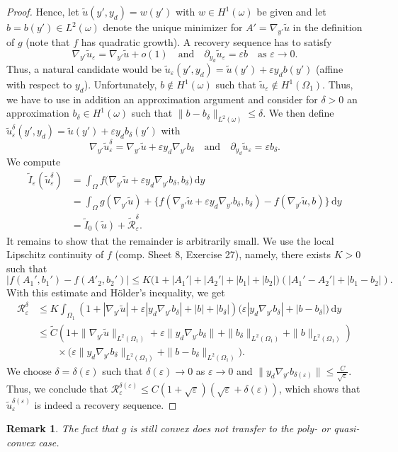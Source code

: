 \documentclass[a4paper,12pt]{article}
\newcommand{\eps}{\varepsilon}
\newcommand{\dd}{\,\mathrm{d}}
\newcommand{\wt}{\widetilde}
\newtheorem{remark}[theorem]{Remark}
\begin{document}
\begin{proof}
Hence, let $\wt u(y',y_d) = w(y')$ with $w\in H^1(\omega)$ be given and let $b=b(y')\in L^2(\omega)$ denote the unique minimizer
for $A' = \nabla_{y'} \wt u$ in the definition of $g$ (note that $f$ has quadratic growth). A recovery sequence has to satisfy
\[
\nabla_{y'} \wt u_\eps = \nabla_{y'}\wt u + o(1)\quad\text{and}
\quad \partial_{y_d}\wt u_\eps = \eps b\quad\text{as }\eps\to 0.
\]
Thus, a natural candidate would be $\wt u_\eps(y',y_d) = 
\wt u(y') + \eps y_d  b(y')$ (affine with respect to $y_d$).
Unfortunately, $b\notin H^1(\omega)$ such that $\wt u_\eps\notin H^1(\Omega_1)$. Thus, we have to use in addition an approximation argument and consider for $\delta>0$ an approximation $b_\delta\in H ^1(\omega)$ such that $\|b-b_
\delta\|_{L^2(\omega)} \leq \delta$. We then define 
$\wt u_\eps^\delta(y',y_d) = 
\wt u(y') + \eps y_d  b_\delta(y')$ with
\[
\nabla_{y'}\wt u_\eps^\delta = 
\nabla_{y'}\wt u + \eps y_d \nabla_{y'} b_\delta\quad\text{and}\quad
\partial_{y_d}\wt u_\eps = \eps b_\delta.
\]
We compute
\begin{align*}
    \wt I_\eps(\wt u_\eps^\delta) &= \int_{\Omega} f\big(\nabla_{y'}\wt u + \eps y_d \nabla_{y'} b_\delta, b_\delta\big)\dd y\\
    & = \int_{\Omega} g(\nabla_{y'}\wt u ) +\big\{f(\nabla_{y'}\wt u + \eps y_d \nabla_{y'} b_\delta, b_\delta) - f(\nabla_{y'}\wt u, b)\big\}\dd y\\
    &=\wt I_0(\wt u ) + \wt{\mathcal{R}}_\eps^\delta.
\end{align*}
It remains to show that the remainder is arbitrarily small. We use the local Lipschitz continuity of $f$ (comp. Sheet 8, Exercise 27), namely, there exists $K>0$ such that
\[
|f(A_1',b_1') - f(A'_2,b_2')|
\leq K\big(1+|A_1'| + |A_2'| + |b_1| + |b_2|\big)
(|A_1'{-}A_2'| + |b_1{-}b_2|).
\]
With this estimate and Hölder's inequality, we get
\begin{align*}
\mathcal{R}_\eps^\delta
&\leq K\int_{\Omega_1}(1+|\nabla_{y'}\wt u|+\eps|y_d\nabla_{y'}b_\delta| + |b| + |b_\delta|) \big(
\eps|y_d\nabla_{y'} b_\delta| +|b{-}b_\delta| \big)\dd y\\
&\leq \wt C(1+
\|\nabla_{y'} \wt u\|_{L^2(\Omega_1)} + 
\eps \|y_d\nabla_{y'} b_\delta\|_{} +
\|b_\delta\|_{L^2(\Omega_1)}+ \|b\|_{L^2(\Omega_1)})\\&
\qquad\times\big(\eps\|y_d\nabla_{y'} b_\delta\|_{L^2(\Omega_1)}
+\|b{-}b_\delta\|_{L^2(\Omega_1)}\big).
\end{align*}
We choose $\delta = \delta(\eps)$ such that 
$\delta(\eps) \to 0$ as $\eps\to 0$ and $\|y_d\nabla_{y'} b_{\delta(\eps)}\| \leq \frac{C} {\sqrt{\eps}}$. Thus, we conclude
that $\mathcal{R}_\eps^{\delta(\eps)} \leq C(1+\sqrt{\eps})(\sqrt{\eps} + \delta(\eps))$, which shows that $\wt u_\eps^{\delta(\eps)}$ is
indeed a recovery sequence.
\end{proof}

 \begin{remark}
 The fact that $g$ is still convex does not transfer to the poly- or quasi-convex case.
 \end{remark}
\end{document}
